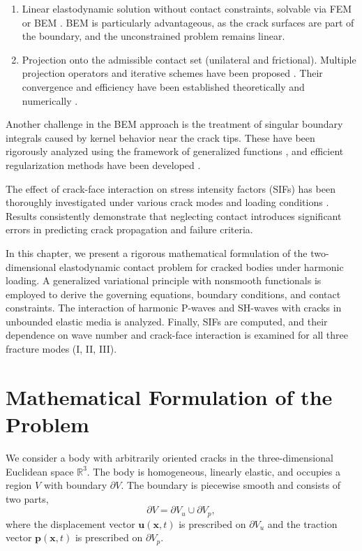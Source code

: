 \begin{enumerate}
	\item Linear elastodynamic solution without contact constraints, solvable via FEM or BEM \cite{GuzZozulyaRef2,GuzZozulyaRef3,GuzZozulyaRef4,GuzZozulyaRef22,GuzZozulyaRef12,GuzZozulyaRef25}.  
	BEM is particularly advantageous, as the crack surfaces are part of the boundary, and the unconstrained problem remains linear.  
	\item Projection onto the admissible contact set (unilateral and frictional).  
	Multiple projection operators and iterative schemes have been proposed \cite{GuzZozulyaRef30}.  
	Their convergence and efficiency have been established theoretically and numerically \cite{GuzZozulyaRef11,GuzZozulyaRef19,GuzZozulyaRef20,GuzZozulyaRef32}.
\end{enumerate}

Another challenge in the BEM approach is the treatment of singular boundary integrals caused by kernel behavior near the crack tips.  
These have been rigorously analyzed using the framework of generalized functions \cite{GuzZozulyaRef10}, and efficient regularization methods have been developed \cite{GuzZozulyaRef31}.

The effect of crack-face interaction on stress intensity factors (SIFs) has been thoroughly investigated under various crack modes and loading conditions \cite{GuzZozulyaRef11,GuzZozulyaRef18,GuzZozulyaRef19,GuzZozulyaRef20,GuzZozulyaRef32}.  
Results consistently demonstrate that neglecting contact introduces significant errors in predicting crack propagation and failure criteria.

In this chapter, we present a rigorous mathematical formulation of the two-dimensional elastodynamic contact problem for cracked bodies under harmonic loading.  
A generalized variational principle with nonsmooth functionals is employed to derive the governing equations, boundary conditions, and contact constraints.  
The interaction of harmonic P-waves and SH-waves with cracks in unbounded elastic media is analyzed.  
Finally, SIFs are computed, and their dependence on wave number and crack-face interaction is examined for all three fracture modes (I, II, III).

\section{Mathematical Formulation of the Problem}

We consider a body with arbitrarily oriented cracks in the three-dimensional Euclidean space $\mathbb{R}^{3}$.  
The body is homogeneous, linearly elastic, and occupies a region $V$ with boundary $\partial V$.  
The boundary is piecewise smooth and consists of two parts,
\[
\partial V = \partial V_{u} \cup \partial V_{p},
\]
where the displacement vector $\mathbf{u}(\mathbf{x},t)$ is prescribed on $\partial V_u$ and the traction vector $\mathbf{p}(\mathbf{x},t)$ is prescribed on $\partial V_p$.

